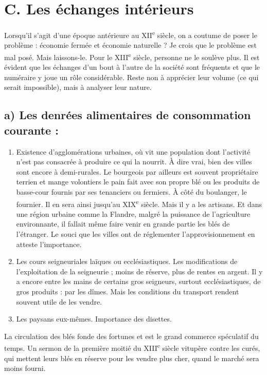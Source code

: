 \documentclass[french,twoside]{book} %
\def\bignobreak{\ifdim\lastskip<\bigskipamount
  \removelastskip\nopagebreak\bigskip\fi}
\newcommand{\labelblock}[1]{\bigskip{\color{rubric}\bfseries\centering #1\par}\bignobreak}
\begin{document}
\section[C. Les échanges intérieurs]{C. Les échanges intérieurs}
\label{c09c}
\noindent Lorsqu’il s’agit d’une époque antérieure au XII\textsuperscript{e} siècle, on a coutume de poser le problème : économie fermée et économie naturelle ? Je crois que le problème est mal posé. Mais laissons-le. Pour le XIII\textsuperscript{e} siècle, personne ne le soulève plus. Il est évident que les échanges d’un bout à l’autre de la société sont fréquents et que le numéraire y joue un rôle considérable. Reste non à apprécier leur volume (ce qui serait impossible), mais à analyser leur nature.\par

\labelblock{Quels sont les principaux objets des échanges ?}

\subsection[a) Les denrées alimentaires de consommation courante :]{a) Les denrées alimentaires de consommation courante :}

\begin{enumerate}[itemsep=0pt,]
\item Existence d’agglomérations urbaines, où vit une population dont l’activité n’est pas consacrée à produire ce qui la nourrit. À dire vrai, bien des villes sont encore à demi-rurales. Le bourgeois par ailleurs est souvent propriétaire terrien et mange volontiers le pain fait avec son propre blé ou les produits de basse-cour fournis par ses tenanciers ou fermiers. À côté du boulanger, le fournier. Il en sera ainsi jusqu’au XIX\textsuperscript{e} siècle. Mais il y a les artisans. Et dans une région urbaine comme la Flandre, malgré la puissance de l’agriculture environnante, il fallait même faire venir en grande partie les blés de l’étranger. Le souci que les villes ont de réglementer l’approvisionnement en atteste l’importance.
\item Les cours seigneuriales laïques ou ecclésiastiques. Les modifications de l’exploitation de la seigneurie ; moins de réserve, plus de rentes en argent. Il y a encore entre les mains de certains gros seigneurs, surtout ecclésiastiques, de gros produits : par les dîmes. Mais les conditions du transport rendent souvent utile de les vendre.
\item  {}
\label{p90} Les paysans eux-mêmes. Importance des disettes.

\end{enumerate}\noindent La circulation des blés fonde des fortunes et est le grand commerce spéculatif du temps. Un sermon de la première moitié du XIII\textsuperscript{e} siècle vitupère contre les curés, qui mettent leurs blés en réserve pour les vendre plus cher, quand le marché sera moins fourni.
\end{document}
